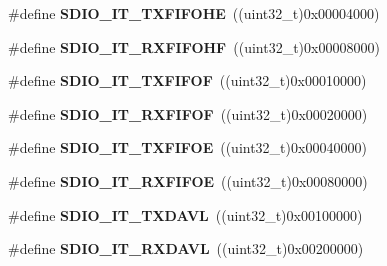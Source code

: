 \begin{DoxyCompactItemize}
\item 
\hypertarget{group___s_d_i_o___interrupt__sources_gaf538ae7dd73d55e76069e8710858038a}{}\#define {\bfseries S\+D\+I\+O\+\_\+\+I\+T\+\_\+\+T\+X\+F\+I\+F\+O\+H\+E}~((uint32\+\_\+t)0x00004000)\label{group___s_d_i_o___interrupt__sources_gaf538ae7dd73d55e76069e8710858038a}

\item 
\hypertarget{group___s_d_i_o___interrupt__sources_gadcbc1a0de8b9df83b5c6c839b4739c87}{}\#define {\bfseries S\+D\+I\+O\+\_\+\+I\+T\+\_\+\+R\+X\+F\+I\+F\+O\+H\+F}~((uint32\+\_\+t)0x00008000)\label{group___s_d_i_o___interrupt__sources_gadcbc1a0de8b9df83b5c6c839b4739c87}

\item 
\hypertarget{group___s_d_i_o___interrupt__sources_ga3ec471bd9233561d6e929ebac6362b75}{}\#define {\bfseries S\+D\+I\+O\+\_\+\+I\+T\+\_\+\+T\+X\+F\+I\+F\+O\+F}~((uint32\+\_\+t)0x00010000)\label{group___s_d_i_o___interrupt__sources_ga3ec471bd9233561d6e929ebac6362b75}

\item 
\hypertarget{group___s_d_i_o___interrupt__sources_gae60a1d8e5a7caff85d84e513b093b8a8}{}\#define {\bfseries S\+D\+I\+O\+\_\+\+I\+T\+\_\+\+R\+X\+F\+I\+F\+O\+F}~((uint32\+\_\+t)0x00020000)\label{group___s_d_i_o___interrupt__sources_gae60a1d8e5a7caff85d84e513b093b8a8}

\item 
\hypertarget{group___s_d_i_o___interrupt__sources_gabff1466c2f2effbe30b80a11c132d7c0}{}\#define {\bfseries S\+D\+I\+O\+\_\+\+I\+T\+\_\+\+T\+X\+F\+I\+F\+O\+E}~((uint32\+\_\+t)0x00040000)\label{group___s_d_i_o___interrupt__sources_gabff1466c2f2effbe30b80a11c132d7c0}

\item 
\hypertarget{group___s_d_i_o___interrupt__sources_ga80b01aaf64c873d21bfa95e5d98d8766}{}\#define {\bfseries S\+D\+I\+O\+\_\+\+I\+T\+\_\+\+R\+X\+F\+I\+F\+O\+E}~((uint32\+\_\+t)0x00080000)\label{group___s_d_i_o___interrupt__sources_ga80b01aaf64c873d21bfa95e5d98d8766}

\item 
\hypertarget{group___s_d_i_o___interrupt__sources_gac8e5744e6d977182a6fc7484a6f1195e}{}\#define {\bfseries S\+D\+I\+O\+\_\+\+I\+T\+\_\+\+T\+X\+D\+A\+V\+L}~((uint32\+\_\+t)0x00100000)\label{group___s_d_i_o___interrupt__sources_gac8e5744e6d977182a6fc7484a6f1195e}

\item 
\hypertarget{group___s_d_i_o___interrupt__sources_gaf236079642db95772334d1e9b9b27570}{}\#define {\bfseries S\+D\+I\+O\+\_\+\+I\+T\+\_\+\+R\+X\+D\+A\+V\+L}~((uint32\+\_\+t)0x00200000)\label{group___s_d_i_o___interrupt__sources_gaf236079642db95772334d1e9b9b27570}


\end{DoxyCompactItemize}
